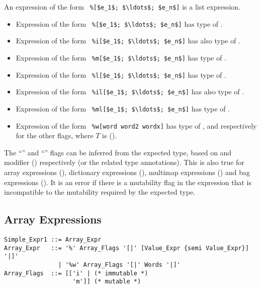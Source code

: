 An expression of the form ~\lstinline!%[$e_1$; $\ldots$; $e_n$]! is a list expression. 

\begin{itemize}
  \item Expression of the form ~\lstinline!%[$e_1$; $\ldots$; $e_n$]!
    has type of . 
  \item Expression of the form ~\lstinline!%i[$e_1$; $\ldots$; $e_n$]!
    has also type of . 
  \item Expression of the form ~\lstinline!%m[$e_1$; $\ldots$; $e_n$]!
    has type of . 
  \item Expression of the form ~\lstinline!%l[$e_1$; $\ldots$; $e_n$]!
    has type of . 
  \item Expression of the form ~\lstinline!%il[$e_1$; $\ldots$; $e_n$]!
    has also type of . 
  \item Expression of the form ~\lstinline!%ml[$e_1$; $\ldots$; $e_n$]!
    has type of . 
  \item Expression of the form ~\lstinline!%w[word word2 wordx]!
    has type of , and respectively for the other flags, where $T$ is  (). 
\end{itemize}

The ``'' and ``'' flags can be inferred from the expected type, based on  and  modifier () respectively (or the related type annotations). This is also true for array expressions (), dictionary expressions (), multimap expressions () and bag expressions (). It is an error if there is a mutability flag in the expression that is incompatible to the mutability required by the expected type. 





\subsection{Array Expressions}
\label{sec:array-expressions}

\syntax\begin{lstlisting}
Simple_Expr1 ::= Array_Expr
Array_Expr   ::= '%' Array_Flags '[|' [Value_Expr {semi Value_Expr}] '|]'
               | '%w' Array_Flags '[|' Words '|]'
Array_Flags  ::= [['i' | (* immutable *)
                   'm']] (* mutable *)
\end{lstlisting}


